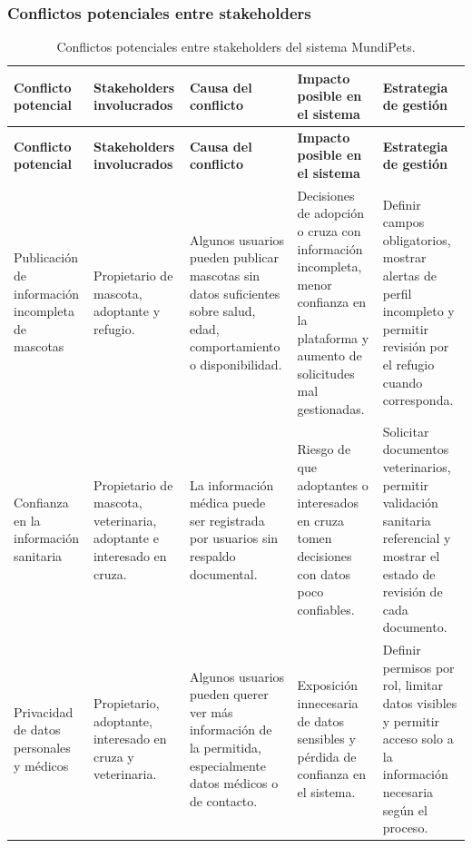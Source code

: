 \documentclass[journal,onecolumn]{IEEEtran}
\begin{document}
	\subsubsection{Conflictos potenciales entre stakeholders}
	\label{sec:conflictos}
	
	\begin{longtable}{|p{2.2cm}|p{2.2cm}|p{2.8cm}|p{3.2cm}|p{3.3cm}|}
		\caption{Conflictos potenciales entre stakeholders del sistema MundiPets.} \label{tab:matriz_conflictos} \\
		\hline
		\textbf{Conflicto potencial} & \textbf{Stakeholders involucrados} & \textbf{Causa del conflicto} & \textbf{Impacto posible en el sistema} & \textbf{Estrategia de gestión} \\
		\hline
		\endfirsthead
		\hline
		\textbf{Conflicto potencial} & \textbf{Stakeholders involucrados} & \textbf{Causa del conflicto} & \textbf{Impacto posible en el sistema} & \textbf{Estrategia de gestión} \\
		\hline
		\endhead
		\hline
		\endfoot
		\hline
		\endlastfoot
		
		Publicación de información incompleta de mascotas & Propietario de mascota, adoptante y refugio. & Algunos usuarios pueden publicar mascotas sin datos suficientes sobre salud, edad, comportamiento o disponibilidad. & Decisiones de adopción o cruza con información incompleta, menor confianza en la plataforma y aumento de solicitudes mal gestionadas. & Definir campos obligatorios, mostrar alertas de perfil incompleto y permitir revisión por el refugio cuando corresponda. \\ \hline
		
		Confianza en la información sanitaria & Propietario de mascota, veterinaria, adoptante e interesado en cruza. & La información médica puede ser registrada por usuarios sin respaldo documental. & Riesgo de que adoptantes o interesados en cruza tomen decisiones con datos poco confiables. & Solicitar documentos veterinarios, permitir validación sanitaria referencial y mostrar el estado de revisión de cada documento. \\ \hline
		
		Privacidad de datos personales y médicos & Propietario, adoptante, interesado en cruza y veterinaria. & Algunos usuarios pueden querer ver más información de la permitida, especialmente datos médicos o de contacto. & Exposición innecesaria de datos sensibles y pérdida de confianza en el sistema. & Definir permisos por rol, limitar datos visibles y permitir acceso solo a la información necesaria según el proceso. \\ \hline
		

\end{longtable}
\end{document}
